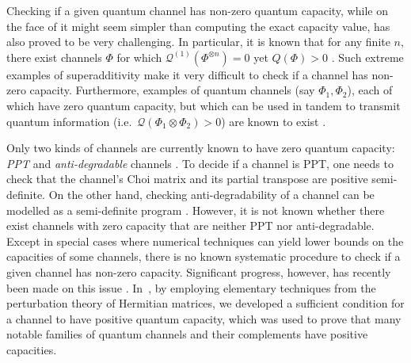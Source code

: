 \documentclass[a4paper,onecolumn,10pt,accepted=2022-07-11]{quantumarticle}
\theoremstyle{definition}
\begin{document}

Checking if a given quantum channel has non-zero quantum capacity, while on the face of it might seem simpler than computing the exact capacity value, has also proved to be very challenging. In particular, it is known that for any finite $n$, there exist channels $\Phi$ for which $\mathcal{Q}^{(1)}(\Phi^{\otimes n})=0$ yet $Q(\Phi)>0$ \cite{Cubitt2015unbounded}. 
Such extreme examples of superadditivity make it very difficult to check if a channel has non-zero capacity. Furthermore, examples of quantum channels (say $\Phi_1, \Phi_2$), each of which have zero quantum capacity, but which can be used in tandem to transmit quantum information (i.e.~$\mathcal{Q}(\Phi_1 \otimes \Phi_2)>0$) are known to exist \cite{Yard2008super}. 


Only two kinds of channels are currently known to have zero quantum capacity: \emph{PPT} \cite{Horodecki2000PPT} and \emph{anti-degradable} \cite{Devetak2005degradable, Cubitt2008degradable} channels \cite{Smith2012incapacity}. To decide if a channel is PPT, one needs to check that the channel's Choi matrix and its partial transpose are positive semi-definite. On the other hand, checking anti-degradability of a channel can be modelled as a semi-definite program \cite{sutter2017approx}. However, it is not known whether there exist channels with zero capacity that are neither PPT nor anti-degradable. Except in special cases where numerical techniques can yield lower bounds on the capacities of some channels, there is no known systematic procedure to check if a given channel has non-zero capacity. Significant progress, however, has recently been made on this issue \cite{siddhu2020logsingularities,Singh2022detecting}. In~\cite{Singh2022detecting}, by employing elementary techniques from the perturbation theory of Hermitian matrices, we developed a sufficient condition for a channel to have positive quantum capacity, which was used to prove that many notable families of quantum channels and their complements have positive capacities.
\end{document}
